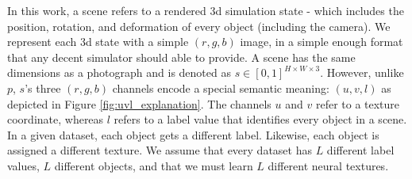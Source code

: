 \documentclass{article}
\begin{document}
	In this work, a scene refers to a rendered 3d simulation state - which includes the position, rotation, and deformation of every object (including the camera).
	We represent each 3d state with a simple $(r,g,b)$ image, in a simple enough format that any decent simulator should able to provide.
	A scene has the same dimensions as a photograph and is denoted as 
	$s \in [0,1]^{H \times W \times 3}$.
	However, unlike $p$, $s$'s three $(r,g,b)$ channels encode a special semantic meaning: $(u,v,l)$ as depicted in Figure \ref{fig:uvl_explanation}.
	The channels $u$ and $v$ refer to a texture coordinate, whereas $l$ refers to a label value that identifies every object in a scene.
	In a given dataset, each object gets a different label. Likewise, each object is assigned a different texture.
	We assume that every dataset has $L$ different label values, $L$ different objects, and that we must learn $L$ different neural textures.






\end{document}
